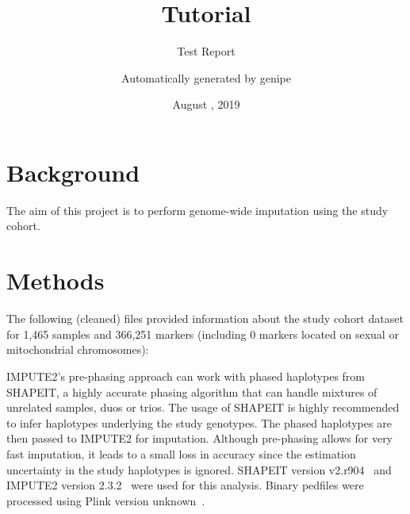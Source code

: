 \documentclass[10pt,twoside,english]{scrartcl}
\newcommand{\ReportNumber}{Test Report}
\let\tempone\itemize
\let\temptwo\enditemize
\renewenvironment{itemize}{\tempone\setlength{\itemsep}{0pt}}{\temptwo}
\begin{document}
\title{Tutorial}


\subtitle{\ReportNumber}


\author{Automatically generated by genipe}


\date{August , 2019}

\maketitle
{} %

\tableofcontents{}




\section{Background}\label{sec:background}

The aim of this project is to perform genome-wide imputation using the study cohort.

\section{Methods}\label{sec:methods}


The following (cleaned) files provided information about the study cohort
dataset for 1,465 samples and 366,251
markers (including 0 markers located on sexual or
mitochondrial chromosomes):

\begin{itemize}
  \item {}
  \item {}
  \item {}
\end{itemize}

IMPUTE2's pre-phasing approach can work with phased haplotypes from SHAPEIT, a
highly accurate phasing algorithm that can handle mixtures of unrelated
samples, duos or trios. The usage of SHAPEIT is highly recommended to infer
haplotypes underlying the study genotypes. The phased haplotypes are then
passed to IMPUTE2 for imputation. Although pre-phasing allows for very fast
imputation, it leads to a small loss in accuracy since the estimation
uncertainty in the study haplotypes is ignored. SHAPEIT version
v2.r904~\cite{Delaneau13_23269371} and IMPUTE2 version
2.3.2~\cite{Howie09_19543373,Howie11_22384356,Howie12_22820512}
were used for this analysis. Binary pedfiles were processed using Plink version
unknown~\cite{Purcell07_17701901}.\\
\end{document}
